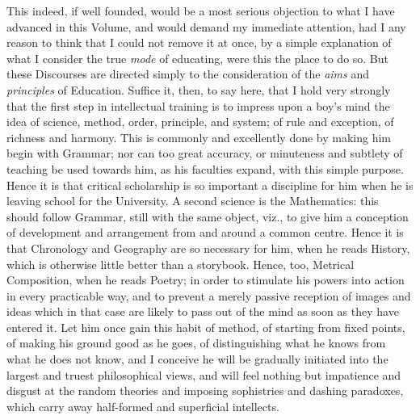 This indeed, if well founded, would be a most serious objection to
what I have advanced in this Volume, and would demand my immediate
attention, had I any reason to think that I could not remove it at once,
by a simple explanation of what I consider the true \emph{mode} of
educating, were this the place to do so. But these Discourses are
directed simply to the consideration of the \emph{aims} and \emph{principles}
of Education. Suffice it, then, to say here, that I hold very strongly
that the first step in intellectual training is to impress upon a boy's
mind the idea of science, method, order, principle, and system; of rule
and exception, of richness and harmony. This is commonly and excellently
done by making him begin with Grammar; nor can too great accuracy, or
minuteness and subtlety of teaching be used towards him, as his
faculties expand, with this simple purpose. Hence it is that critical
scholarship is so important a discipline for him when he is leaving
school for the University. A second science is the Mathematics: this
should follow Grammar, still with the same object, viz., to give him a
conception of development and arrangement from and around a common
centre. Hence it is that Chronology and Geography are so necessary for
him, when he reads History, which is otherwise little better than a
storybook. Hence, too, Metrical Composition, when he reads Poetry; in
order to stimulate his powers into action in every practicable way, and
to prevent a merely passive reception of images and ideas which in that
case are likely to pass out of the mind as soon as they have entered it.
Let him once gain this habit of method, of starting from fixed points,
of making his ground good as he goes, of distinguishing what he knows
from what he does not know, and I conceive he will be gradually
initiated into the largest and truest philosophical views, and will
feel nothing but impatience and disgust at the random theories and
imposing sophistries and dashing paradoxes, which carry away half-formed
and superficial intellects.

